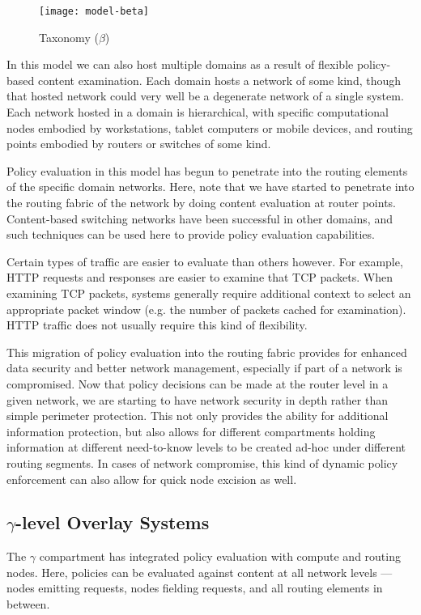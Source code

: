 \begin{figure}[!t]
\centering
\texttt{[image: model-beta]}
\caption{Taxonomy ($\beta$)}
\label{fig:model:taxonomy-beta}
\end{figure}

In this model we can also host multiple domains as a result of flexible policy-based content examination.  Each domain hosts a network of some kind, though that hosted network could very well be a degenerate network of a single system.  Each network hosted in a domain is hierarchical, with specific computational nodes embodied by workstations, tablet computers or mobile devices, and routing points embodied by routers or switches of some kind.

Policy evaluation in this model has begun to penetrate into the routing elements of the specific domain networks.  Here, note that we have started to penetrate into the routing fabric of the network by doing content evaluation at router points.  Content-based switching networks have been successful in other domains, and such techniques can be used here to provide policy evaluation capabilities.  

Certain types of traffic are easier to evaluate than others however.  For example, HTTP requests and responses are easier to examine that TCP packets.  When examining TCP packets, systems generally require additional context to select an appropriate packet window (e.g. the number of packets cached for examination).  HTTP traffic does not usually require this kind of flexibility.

This migration of policy evaluation into the routing fabric provides for enhanced data security and better network management, especially if part of a network is compromised.  Now that policy decisions can be made at the router level in a given network, we are starting to have network security in depth rather than simple perimeter protection.  This not only provides the ability for additional information protection, but also allows for different compartments holding information at different need-to-know levels to be created ad-hoc under different routing segments.  In cases of network compromise, this kind of dynamic policy enforcement can also allow for quick node excision as well.

\subsection{$\gamma$-level Overlay Systems}
The $\gamma$ compartment has integrated policy evaluation with compute and routing nodes.  Here, policies can be evaluated against content at all network levels --- nodes emitting requests, nodes fielding requests, and all routing elements in between.

